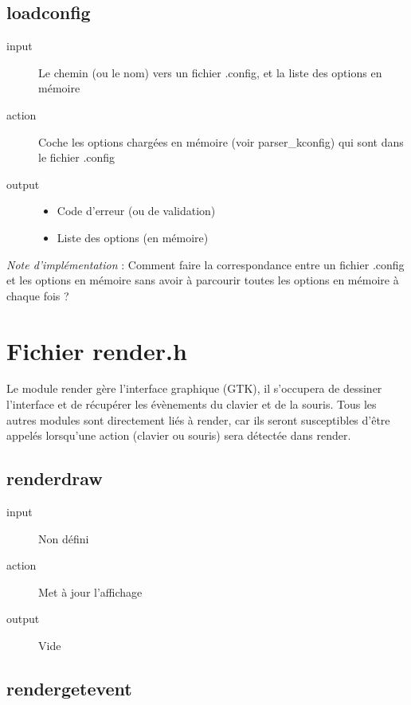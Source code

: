 \documentclass[16pts]{report}
\begin{document}
\section{load\textunderscore config}
\label{sec:load config}
\begin{description}
    \item[input] Le chemin (ou le nom) vers un fichier .config, et la liste des
        options en mémoire
    \item[action] Coche les options chargées en mémoire (voir parser\_kconfig)
        qui sont dans le fichier .config
    \item[output]
    \begin{itemize}
        \item Code d'erreur (ou de validation)
        \item Liste des options (en mémoire)
    \end{itemize}
\end{description}

\textit{Note d’implémentation} : Comment faire la correspondance entre un fichier
.config et les options en mémoire sans avoir à parcourir toutes les options
en mémoire à chaque fois ?


\chapter{Fichier render.h}
\label{cha:Fichier render.h}
Le module render gère l’interface graphique (GTK), il s’occupera de dessiner
l’interface et de récupérer les évènements du clavier et de la souris. Tous les
autres modules sont directement liés à render, car ils seront susceptibles
d’être appelés lorsqu’une action (clavier ou souris) sera détectée dans render.

\section{render\textunderscore draw}
\label{sec:render draw}
\begin{description}
    \item[input] Non défini
    \item[action] Met à jour l'affichage
    \item[output] Vide
\end{description}

\section{render\textunderscore get\textunderscore event}
\label{sec:render get event}
\end{document}
